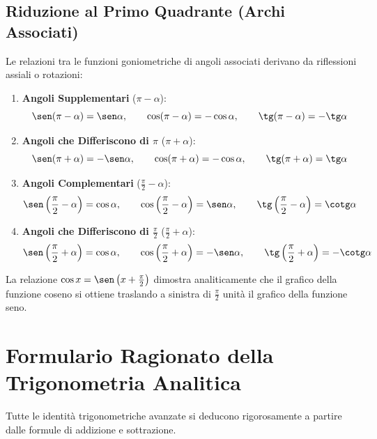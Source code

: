 \subsection{Riduzione al Primo Quadrante (Archi Associati)}
Le relazioni tra le funzioni goniometriche di angoli associati derivano da riflessioni assiali o rotazioni:
\begin{enumerate}
    \item \textbf{Angoli Supplementari} ($\pi - \alpha$):
    \[
        \sen(\pi - \alpha) = \sen \alpha, \qquad \cos(\pi - \alpha) = -\cos \alpha, \qquad \tg(\pi - \alpha) = -\tg \alpha
    \]
    \item \textbf{Angoli che Differiscono di $\pi$} ($\pi + \alpha$):
    \[
        \sen(\pi + \alpha) = -\sen \alpha, \qquad \cos(\pi + \alpha) = -\cos \alpha, \qquad \tg(\pi + \alpha) = \tg \alpha
    \]
    \item \textbf{Angoli Complementari} ($\frac{\pi}{2} - \alpha$):
    \[
        \sen\left(\frac{\pi}{2} - \alpha\right) = \cos \alpha, \qquad \cos\left(\frac{\pi}{2} - \alpha\right) = \sen \alpha, \qquad \tg\left(\frac{\pi}{2} - \alpha\right) = \cotg \alpha
    \]
    \item \textbf{Angoli che Differiscono di $\frac{\pi}{2}$} ($\frac{\pi}{2} + \alpha$):
    \[
        \sen\left(\frac{\pi}{2} + \alpha\right) = \cos \alpha, \qquad \cos\left(\frac{\pi}{2} + \alpha\right) = -\sen \alpha, \qquad \tg\left(\frac{\pi}{2} + \alpha\right) = -\cotg \alpha
    \]
\end{enumerate}

\begin{osservazione}
La relazione $\cos x = \sen\left(x + \frac{\pi}{2}\right)$ dimostra analiticamente che il grafico della funzione coseno si ottiene traslando a sinistra di $\frac{\pi}{2}$ unità il grafico della funzione seno.
\end{osservazione}

\section{Formulario Ragionato della Trigonometria Analitica}
\label{sec:formulario_trig}

Tutte le identità trigonometriche avanzate si deducono rigorosamente a partire dalle formule di addizione e sottrazione.

